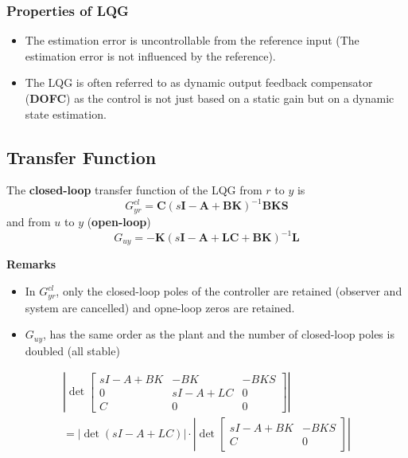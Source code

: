\subsubsection{Properties of LQG}

\begin{itemize}
    \item The estimation error is uncontrollable from the reference input (The estimation error is not influenced by the reference).
    \item The LQG is often referred to as dynamic output feedback compensator (\textbf{DOFC}) as the control is not just based on a static gain but on a dynamic state estimation.
\end{itemize}

\subsection{Transfer Function}
The \textbf{closed-loop} transfer function of the LQG from $r$ to $y$ is
\begin{equation*}
    G_{yr}^{cl} = \mathbf{C}{(s\mathbf{I}-\mathbf{A}+\mathbf{BK})}^{-1}\mathbf{BKS}
\end{equation*}
and from $u$ to $y$ (\textbf{open-loop})
\begin{equation*}
    G_{uy} = -\mathbf{K}{(s\mathbf{I}-\mathbf{A}+\mathbf{LC}+\mathbf{BK})}^{-1}\mathbf{L}
\end{equation*}

\textbf{Remarks}
\begin{itemize}
    \item In $G_{yr}^{cl}$, only the closed-loop poles of the controller are retained (observer and system are cancelled) and opne-loop zeros are retained.
    \item $G_{uy}$, has the same order as the plant and the number of closed-loop poles is doubled (all stable)
\end{itemize}


\begin{align*}
    \left.\left|\det\begin{bmatrix}sI-A+BK & -BK     & -BKS \\
               0       & sI-A+LC & 0    \\
               C       & 0       & 0\end{bmatrix}\right.\right| \\
    \left.=|\det(sI-A+LC)|\cdot\left|\det\begin{bmatrix}sI-A+BK & -BKS \\
               C       & 0\end{bmatrix}\right.\right|
\end{align*}

